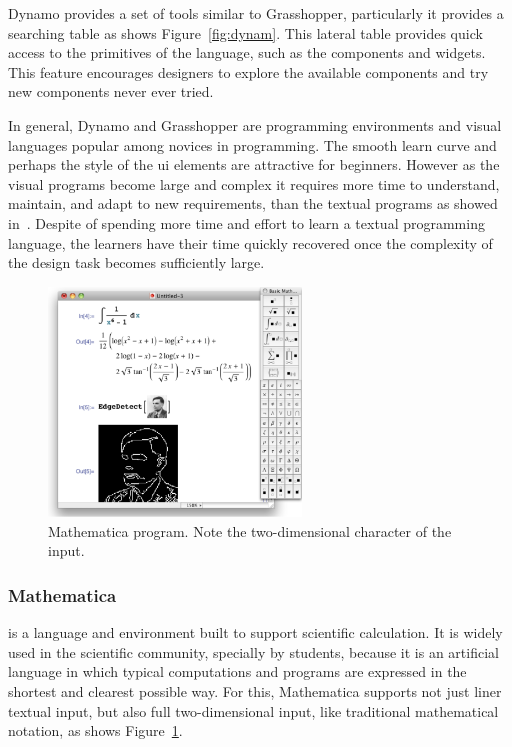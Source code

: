 Dynamo provides a set of tools similar to Grasshopper, particularly it provides a searching table as shows Figure~\ref{fig:dynam}. This lateral table provides quick access to the primitives of the language, such as the components and widgets. This feature encourages designers to explore the available components and try new components never ever tried.  

In general, Dynamo and Grasshopper are programming environments and visual languages popular among novices in programming. The smooth learn curve and perhaps the style of the \ac{ui} elements are attractive for beginners. However as the visual programs become large and complex it requires more time to understand, maintain, and adapt to new requirements, than the textual programs as showed in~\cite{leitao2011programming}. Despite of spending more time and effort to learn a textual programming language, the learners have their time quickly recovered once the complexity of the design task becomes sufficiently large.

\begin{figure}
  \vspace{-40pt}
  \begin{center}
    \includegraphics[width=0.6\textwidth]{img/mathematica}
  \end{center}
  \vspace{-20pt}
 \caption{Mathematica program. Note the two-dimensional character of the input.}  
  \vspace{-25pt}
    \label{fig:math}
\end{figure}

\subsubsection{Mathematica~\cite{wolfram1991mathematica}} is a language and environment built to support scientific calculation. It is widely used in the scientific community, specially by students, because it is an artificial language in which typical computations and programs are expressed in the shortest and clearest possible way. For this, Mathematica supports not just liner textual input, but also full two-dimensional input, like traditional mathematical notation, as shows Figure~\ref{fig:math}.

